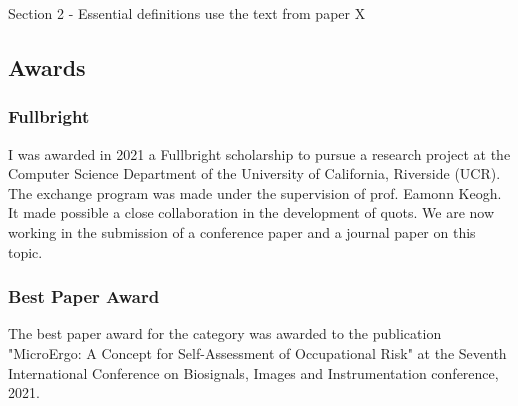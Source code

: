 Section 2 - Essential definitions use the text from paper X


\subsection{Awards}

\subsubsection{Fullbright}

I was awarded in 2021 a Fullbright scholarship to pursue a research project at the Computer Science Department of the University of California, Riverside (UCR). The exchange program was made under the supervision of prof. Eamonn Keogh. It made possible a close collaboration in the development of \gls{quots}. We are now working in the submission of a conference paper and a journal paper on this topic.

\subsubsection{Best Paper Award}

The best paper award for the category was awarded to the publication "MicroErgo: A Concept for Self-Assessment of Occupational Risk" at the Seventh International Conference on Biosignals, Images and Instrumentation conference, 2021.